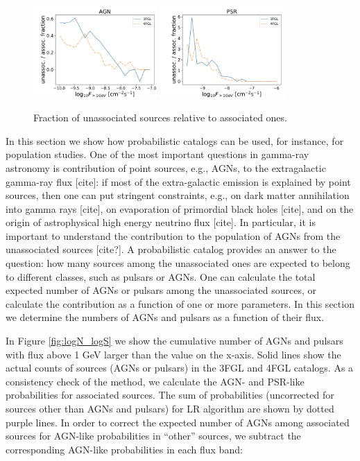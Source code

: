 \begin{figure}[h]
\center
\includegraphics[width=0.42\textwidth]{plots/logN_logS_diff_AGN_unweighted.pdf}
\includegraphics[width=0.42\textwidth]{plots/logN_logS_diff_PSR_unweighted.pdf}
\caption{Fraction of unassociated sources relative to associated ones.}  
\label{fig:unass_vs_ass_frac}
\end{figure}



In this section we show how probabilistic catalogs can be used, for instance, for population studies.
One of the most important questions in gamma-ray astronomy is contribution of point sources, e.g., AGNs, to the extragalactic gamma-ray
flux [cite]:
if most of the extra-galactic emission is explained by point sources, then one can put stringent constraints, 
e.g., on  dark matter annihilation into gamma rays [cite], 
on evaporation of primordial black holes [cite], and on the origin of astrophysical high energy neutrino flux [cite].
In particular, it is important to understand the contribution to the population of AGNs from the unassociated sources [cite?].
A probabilistic catalog provides an answer to the question: how many sources among the unassociated ones are expected to belong to different classes, such as pulsars or AGNs. 
One can calculate the total expected number of AGNs or pulsars among the unassociated sources, or calculate the contribution as a function of one or more parameters.
In this section we determine the numbers of AGNs and pulsars as a function of their flux.

In Figure \ref{fig:logN_logS} we show the cumulative number of AGNs and pulsars with flux above 1 GeV larger than the
value on the x-axis.
Solid lines show the actual counts of sources (AGNs or pulsars) in the 3FGL and 4FGL catalogs.
As a consistency check of the method, we calculate the AGN- and PSR-like probabilities for associated sources.
The sum of probabilities (uncorrected for sources other than AGNs and pulsars) for LR algorithm are shown by dotted purple lines.
In order to correct the expected number of AGNs among associated sources for AGN-like probabilities in ``other'' sources, 
we subtract the corresponding AGN-like probabilities in each flux band:

